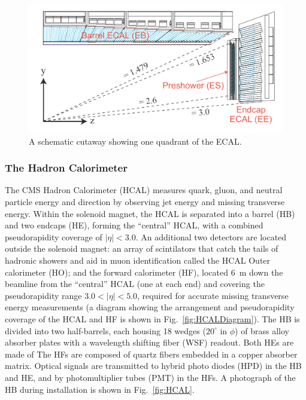 \begin{figure}[H]
    \centering
    \includegraphics[width=\textwidth]{Images/CMS/ECALDiagram.png}
    \caption{A schematic cutaway showing one quadrant of the ECAL.}
    \label{fig:ECALDiagram}
\end{figure}

\subsubsection{The Hadron Calorimeter} \label{sec:HCAL}

The CMS Hadron Calorimeter (HCAL) \cite{HCALTDR} measures quark, gluon, and neutral particle energy and direction by observing jet energy and missing transverse energy. Within the solenoid magnet, the HCAL is separated into a barrel (HB) and two endcaps (HE), forming the ``central'' HCAL, with a combined pseudorapidity coverage of $|\eta| < 3.0$. An additional two detectors are located outside the solenoid magnet: an array of scintilators that catch the tails of hadronic showers and aid in muon identification called the HCAL Outer calorimeter (HO); and the forward calorimeter (HF), located \SI{6}{m} down the beamline from the ``central'' HCAL (one at each end) and covering the pseudorapidity range $3.0<|\eta|<5.0$, required for accurate missing transverse energy measurements (a diagram showing the arrangement and pseudorapidity coverage of the HCAL and HF is shown in Fig.~\ref{fig:HCALDiagram}). The HB is divided into two half-barrels, each housing 18 wedges ($20^{\circ}$ in $\phi$) of brass alloy absorber plates with a wavelength shifting fiber (WSF) readout. Both HEs are made of The HFs are composed of quartz fibers embedded in a copper absorber matrix. Optical signals are transmitted to hybrid photo diodes (HPD) in the HB and HE, and by photomultiplier tubes (PMT) in the HFs. A photograph of the HB during installation is shown in Fig.~\ref{fig:HCAL}.

